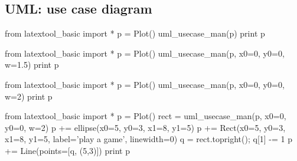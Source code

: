 \subsection{UML: use case diagram}

\begin{python}
from latextool_basic import *
p = Plot()
uml_usecase_man(p)
print p
\end{python}

\begin{python}
from latextool_basic import *
p = Plot()
uml_usecase_man(p, x0=0, y0=0, w=1.5)
print p
\end{python}

\begin{python}
from latextool_basic import *
p = Plot()
uml_usecase_man(p, x0=0, y0=0, w=2)
print p
\end{python}


\begin{python}
from latextool_basic import *
p = Plot()
rect = uml_usecase_man(p, x0=0, y0=0, w=2)
p += ellipse(x0=5, y0=3, x1=8, y1=5)
p += Rect(x0=5, y0=3, x1=8, y1=5, label='play a game', linewidth=0)
q = rect.topright(); q[1] -= 1
p += Line(points=[q, (5,3)])
print p 
\end{python}
